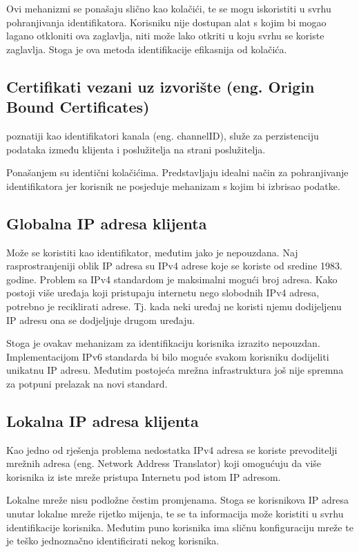 \documentclass[times, utf8, zavrsni]{fer}
\begin{document}
Ovi mehanizmi se ponašaju slično kao kolačići, te se mogu iskoristiti u
svrhu pohranjivanja identifikatora. Korisniku nije dostupan alat s kojim bi
mogao lagano otkloniti ova zaglavlja, niti može lako otkriti u koju svrhu se
koriste zaglavlja. Stoga je ova metoda identifikacije efikasnija od
kolačića.

\subsection{Certifikati vezani uz izvorište (eng. Origin Bound Certificates)}
poznatiji kao identifikatori kanala (eng. channelID), služe
za perzistenciju podataka između klijenta i poslužitelja na strani
poslužitelja.

Ponašanjem su identični kolačićima. Predstavljaju idealni način za
pohranjivanje identifikatora jer korisnik ne posjeduje mehanizam s kojim bi
izbrisao podatke.

\subsection{Globalna IP adresa klijenta}
Može se koristiti kao identifikator, međutim jako je nepouzdana. Naj
rasprostranjeniji oblik IP adresa su IPv4 adrese koje se koriste od sredine
1983. godine. Problem sa IPv4 standardom je maksimalni mogući broj adresa. Kako
postoji više uređaja koji pristupaju internetu nego slobodnih IPv4 adresa,
potrebno je reciklirati adrese. Tj. kada neki uređaj ne koristi njemu
dodijeljenu IP adresu ona se dodjeljuje drugom uređaju.

Stoga je ovakav mehanizam za identifikaciju korisnika izrazito nepouzdan.
Implementacijom IPv6 standarda bi bilo moguće svakom korisniku dodijeliti
unikatnu IP adresu. Međutim postojeća mrežna infrastruktura još nije spremna
za potpuni prelazak na novi standard.

\subsection{Lokalna IP adresa klijenta}
Kao jedno od rješenja problema
nedostatka IPv4 adresa se koriste prevoditelji mrežnih adresa (eng.
Network Address Translator) koji omogućuju da više korisnika iz iste mreže
pristupa Internetu pod istom IP adresom.

Lokalne mreže nisu podložne čestim promjenama. Stoga se korisnikova IP
adresa unutar lokalne mreže rijetko mijenja, te se ta informacija može
koristiti u svrhu identifikacije korisnika. Međutim puno korisnika ima
sličnu konfiguraciju mreže te je teško jednoznačno identificirati nekog
korisnika.
\end{document}
